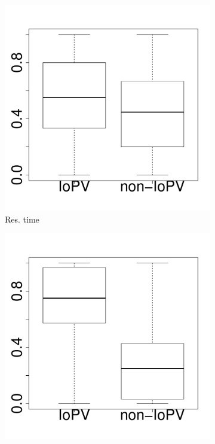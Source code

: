 \begin{figure}[t]
	\centering
        \begin{subfigure}{0.19\textwidth}
                \includegraphics[width=\linewidth]{Figures/runtime-cassandra-boxplot.pdf}
                \caption{Res. time}
        \end{subfigure}%
        \begin{subfigure}{0.19\textwidth}
                \includegraphics[width=\linewidth]{Figures/cpu-cassandra-boxplot.pdf}

\end{subfigure}
\end{figure}
